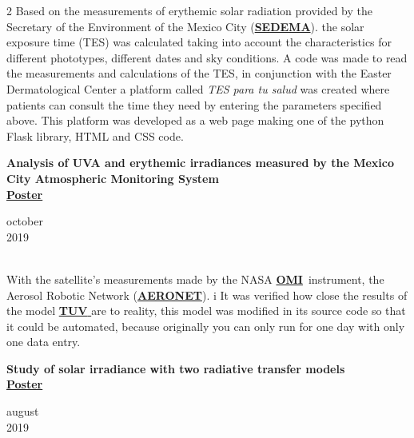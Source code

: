 \documentclass[a3paper,16pt]{adcv}
\newcommand*{\tuv}{\href{https://www2.acom.ucar.edu/modeling/tropospheric-ultraviolet-and-visible-tuv-radiation-model}{\textbf{TUV }}}
\newcommand*{\aeronet}{\href{https://aeronet.gsfc.nasa.gov/}{\textbf{AERONET}}}
\newcommand*{\sedema}{\href{https://www.sedema.cdmx.gob.mx/}{\textbf{SEDEMA}}}
\newcommand*{\omi}{\href{https://aura.gsfc.nasa.gov/omi.html}{\textbf{OMI}}}
\begin{document}
\begin{multicols}{2}
    Based on the measurements of erythemic solar radiation provided by the Secretary of the Environment of the 
    Mexico City (\sedema). the solar exposure time (TES) was calculated taking into account the characteristics for different phototypes, different dates and sky conditions.
     A code was made to read the measurements and calculations of the TES, in conjunction with the Easter Dermatological Center 
    a platform called \textit{TES para tu salud} was created where patients can consult the time they need by entering the parameters specified above. This platform was developed as a
    web page making one of the python Flask library, HTML and CSS code.\\

  \begin{minipage}{0.8\linewidth}
    \textbf{Analysis of UVA and erythemic irradiances measured by the Mexico City Atmospheric Monitoring System}\\
    \href{https://github.com/giovannilopez9808/Posters_templates/blob/master/2019/AFA/Analisis\%20indice\%20UV/Analisis\%20de\%20irradiancia.pdf}{\textbf{Poster}}
  \end{minipage}
    \begin{minipage}{0.2\linewidth}
      \vspace{-0.9cm}
      \begin{flushright}
      october \\2019
      \end{flushright}
    \end{minipage}\\

    With the satellite's measurements made by the NASA \omi~instrument, the Aerosol Robotic Network (\aeronet). i It was verified how close the results of the model \tuv are to reality, this model was modified in its source code so that it could be automated, because originally you can only run for one day with only one data entry.\\

  \begin{minipage}{0.8\linewidth}
    \textbf{Study of solar irradiance with two radiative transfer models}\\
    \href{https://github.com/giovannilopez9808/Posters_templates/tree/master/2019/CNF/Transferencia\%20radiativa}{\textbf{Poster}}
  \end{minipage}
    \begin{minipage}{0.2\linewidth}
      \vspace{-0.9cm}
      \begin{flushright}
      august \\2019
      \end{flushright}
    \end{minipage}\\


\end{multicols}
\end{document}
